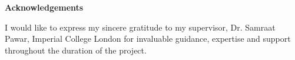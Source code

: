 \begin{center}
    \fontsize{20pt}{25pt}\selectfont
    \textbf{Acknowledgements}
\end{center}

\vspace{1.5cm}

I would like to express my sincere gratitude to my supervisor, Dr. Samraat Pawar, Imperial College London for invaluable guidance, expertise and support throughout the duration of the project.

\vspace{2cm}

